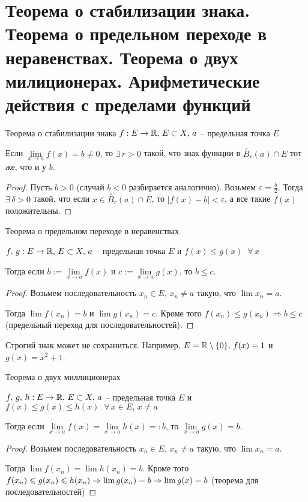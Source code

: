 \section{Теорема о стабилизации знака. Теорема о предельном переходе в неравенствах. Теорема о двух милиционерах. Арифметические действия с пределами функций}

\begin{theorem-non}
    Теорема о стабилизации знака
$f : E \to \mathbb{R}, \, E \subset X, \, a$ -- предельная точка $E$

Если $\lim\limits_{x \to a} f(x) = b \neq 0$, то $\exists \, r > 0$ такой, что знак функции в $\overset{\circ}{B}_r(a) \cap E$ тот же, что и у $b$.
\end{theorem-non}
\begin{proof}
    Пусть $b > 0$ (случай $b < 0$ разбирается аналогично). Возьмем $\varepsilon = \frac{b}{2}$. 
    Тогда $\exists \, \delta > 0$ такой, что если $x \in \overset{\circ}{B}_r(a) \cap E$, то $|f(x) - b| < \varepsilon$,
    а все такие $f(x)$ положительны.
\end{proof}

\begin{theorem-non}
    Теорема о предельном переходе в неравенствах

    $f, \, g : E \to \mathbb{R}, \, E \subset X, \, a$ -- предельная точка $E$ и $f(x) \leqslant g(x) \;\; \forall \, x$

    Тогда если $b := \lim\limits_{x \to a} f(x)$ и $c := \lim\limits_{x \to a} g(x)$, то $b \leqslant c$.
\end{theorem-non}
\begin{proof}
    Возьмем последовательность $x_n \in E, \, x_n \neq a$ такую, что $\lim x_n = a$. 

    Тогда $\lim f(x_n) = b$ и $\lim g(x_n) = c$. Кроме того $f(x_n) \leqslant g(x_n) \Rightarrow b \leqslant c$ (предельный переход для последовательностей).
\end{proof}
\begin{notice}
    Строгий знак может не сохраниться. Например, $E = \mathbb{R} \setminus \{0\}, \, f(x) = 1$ и $g(x) = x^2 + 1$.
\end{notice}

\begin{theorem-non}
    Теорема о двух миллиционерах

    $f, \, g, \, h : E \to \mathbb{R}, \, E \subset X, \, a$ -- предельная точка $E$ и $f(x) \leqslant g(x) \leqslant h(x) \;\; \forall \, x \in E, \, x \neq a$

    Тогда если $\lim\limits_{x \to a} f(x) = \lim\limits_{x \to a} h(x) =: b$, то $\lim\limits_{x \to a} g(x) = b$.
\end{theorem-non}
\begin{proof}
    Возьмем последовательность $x_n \in E, \, x_n \neq a$ такую, что $\lim x_n = a$. 

    Тогда $\lim f(x_n) = \lim h(x_n) = b$. Кроме того $f(x_n) \leqslant g(x_n) \leqslant h(x_n) \Rightarrow \lim g(x_n) = b \\ \Rightarrow \lim g(x) = b$
    (теорема для последовательностей)
\end{proof}

